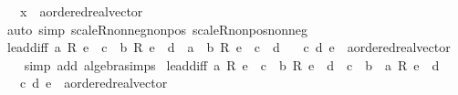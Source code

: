 \begin{isabellebody}
\ \ \ x\ {\isacharcolon}{\kern0pt}{\isacharcolon}{\kern0pt}\ {\isachardoublequoteopen}{\isacharprime}{\kern0pt}a{\isacharcolon}{\kern0pt}{\isacharcolon}{\kern0pt}ordered{\isacharunderscore}{\kern0pt}real{\isacharunderscore}{\kern0pt}vector{\isachardoublequoteclose}\isanewline
%
\isadelimproof
\ \ %
\endisadelimproof
%
\isatagproof
{}\isamarkupfalse%
\ {\isacharparenleft}{\kern0pt}auto\ simp{\isacharcolon}{\kern0pt}\ scaleR{\isacharunderscore}{\kern0pt}nonneg{\isacharunderscore}{\kern0pt}nonpos\ scaleR{\isacharunderscore}{\kern0pt}nonpos{\isacharunderscore}{\kern0pt}nonneg{\isacharparenright}{\kern0pt}%
\endisatagproof
{\isafoldproof}%
%
\isadelimproof
\isanewline
%
\endisadelimproof
\isanewline
{}\isamarkupfalse%
\ le{\isacharunderscore}{\kern0pt}add{\isacharunderscore}{\kern0pt}iff{}{\isacharcolon}{\kern0pt}\ {\isachardoublequoteopen}a\ {\isacharasterisk}{\kern0pt}\isactrlsub R\ e\ {\isacharplus}{\kern0pt}\ c\ {\isasymle}\ b\ {\isacharasterisk}{\kern0pt}\isactrlsub R\ e\ {\isacharplus}{\kern0pt}\ d\ {\isasymlongleftrightarrow}\ {\isacharparenleft}{\kern0pt}a\ {\isacharminus}{\kern0pt}\ b{\isacharparenright}{\kern0pt}\ {\isacharasterisk}{\kern0pt}\isactrlsub R\ e\ {\isacharplus}{\kern0pt}\ c\ {\isasymle}\ d{\isachardoublequoteclose}\isanewline
\ \ \ c\ d\ e\ {\isacharcolon}{\kern0pt}{\isacharcolon}{\kern0pt}\ {\isachardoublequoteopen}{\isacharprime}{\kern0pt}a{\isacharcolon}{\kern0pt}{\isacharcolon}{\kern0pt}ordered{\isacharunderscore}{\kern0pt}real{\isacharunderscore}{\kern0pt}vector{\isachardoublequoteclose}\isanewline
%
\isadelimproof
\ \ %
\endisadelimproof
%
\isatagproof
{}\isamarkupfalse%
\ {\isacharparenleft}{\kern0pt}simp\ add{\isacharcolon}{\kern0pt}\ algebra{\isacharunderscore}{\kern0pt}simps{\isacharparenright}{\kern0pt}%
\endisatagproof
{\isafoldproof}%
%
\isadelimproof
\isanewline
%
\endisadelimproof
\isanewline
{}\isamarkupfalse%
\ le{\isacharunderscore}{\kern0pt}add{\isacharunderscore}{\kern0pt}iff{}{\isacharcolon}{\kern0pt}\ {\isachardoublequoteopen}a\ {\isacharasterisk}{\kern0pt}\isactrlsub R\ e\ {\isacharplus}{\kern0pt}\ c\ {\isasymle}\ b\ {\isacharasterisk}{\kern0pt}\isactrlsub R\ e\ {\isacharplus}{\kern0pt}\ d\ {\isasymlongleftrightarrow}\ c\ {\isasymle}\ {\isacharparenleft}{\kern0pt}b\ {\isacharminus}{\kern0pt}\ a{\isacharparenright}{\kern0pt}\ {\isacharasterisk}{\kern0pt}\isactrlsub R\ e\ {\isacharplus}{\kern0pt}\ d{\isachardoublequoteclose}\isanewline
\ \ \ c\ d\ e\ {\isacharcolon}{\kern0pt}{\isacharcolon}{\kern0pt}\ {\isachardoublequoteopen}{\isacharprime}{\kern0pt}a{\isacharcolon}{\kern0pt}{\isacharcolon}{\kern0pt}ordered{\isacharunderscore}{\kern0pt}real{\isacharunderscore}{\kern0pt}vector{\isachardoublequoteclose}\isanewline

\end{isabellebody}

